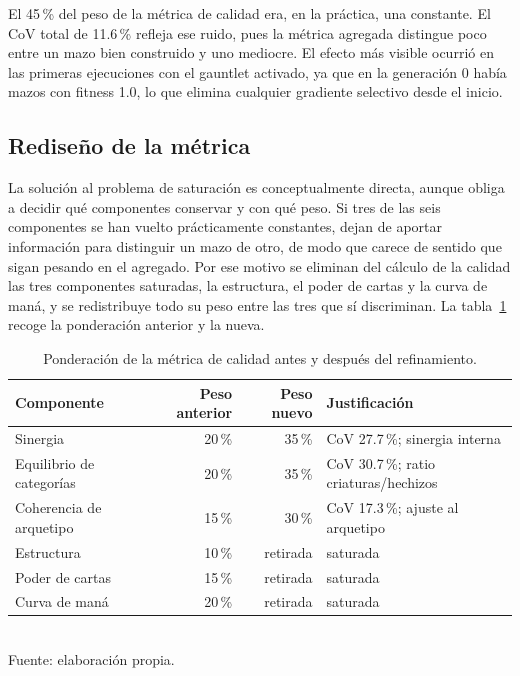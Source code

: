 El 45\,\% del peso de la métrica de calidad era, en la práctica, una constante. El CoV total de 11.6\,\% refleja ese ruido, pues la métrica agregada distingue poco entre un mazo bien construido y uno mediocre. El efecto más visible ocurrió en las primeras ejecuciones con el gauntlet activado, ya que en la generación 0 había mazos con fitness 1.0, lo que elimina cualquier gradiente selectivo desde el inicio.

\subsection{Rediseño de la métrica}

La solución al problema de saturación es conceptualmente directa, aunque obliga a decidir qué componentes conservar y con qué peso. Si tres de las seis componentes se han vuelto prácticamente constantes, dejan de aportar información para distinguir un mazo de otro, de modo que carece de sentido que sigan pesando en el agregado. Por ese motivo se eliminan del cálculo de la calidad las tres componentes saturadas, la estructura, el poder de cartas y la curva de maná, y se redistribuye todo su peso entre las tres que sí discriminan. La tabla~\ref{tab:quality-pesos} recoge la ponderación anterior y la nueva.

\begin{table}[H]
\centering
\caption{Ponderación de la métrica de calidad antes y después del refinamiento.}
\label{tab:quality-pesos}
\begin{tabular}{lrrl}
\toprule
\textbf{Componente} & \textbf{Peso anterior} & \textbf{Peso nuevo} & \textbf{Justificación} \\
\midrule
Sinergia                  & 20\,\% & 35\,\% & CoV 27.7\,\%; sinergia interna \\
Equilibrio de categorías  & 20\,\% & 35\,\% & CoV 30.7\,\%; ratio criaturas/hechizos \\
Coherencia de arquetipo   & 15\,\% & 30\,\% & CoV 17.3\,\%; ajuste al arquetipo \\
\midrule
Estructura                & 10\,\% & retirada & saturada \\
Poder de cartas           & 15\,\% & retirada & saturada \\
Curva de maná             & 20\,\% & retirada & saturada \\
\bottomrule
\end{tabular}
\\[2pt]{\footnotesize Fuente: elaboración propia.}
\end{table}


